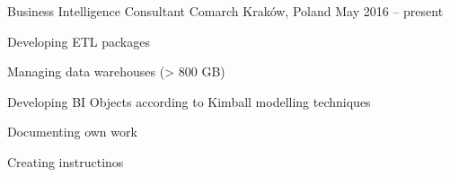 

\begin{cventries}
  \cventry
    {Business Intelligence Consultant} %
    {Comarch} %
    {Kraków, Poland} %
    {May 2016 -- present} %
    {
      \begin{cvitems} %
        \item {Developing ETL packages}
        \item {Managing data warehouses (> 800 GB)}
        \item {Developing BI Objects according to Kimball modelling techniques}
        \item {Documenting own work}
        \item {Creating instructinos}
      \end{cvitems}
    }


\end{cventries}
